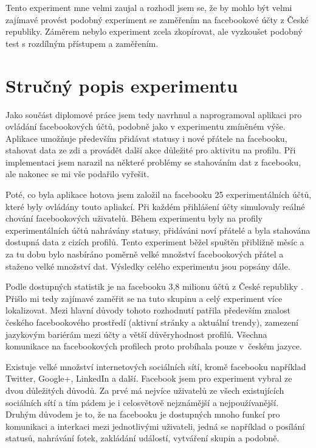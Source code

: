 \documentclass[thesis=M,czech]{FITthesis}[2013/05/10]
\begin{document}
Tento experiment mne velmi zaujal a rozhodl jsem se, že by mohlo být velmi zajímavé provést podobný experiment se zaměřením na facebookové účty z České republiky. Záměrem nebylo experiment zcela zkopírovat, ale vyzkoušet podobný test s rozdílným přístupem a zaměřením. 

\section{Stručný popis experimentu}

Jako součást diplomové práce jsem tedy navrhnul a naprogramoval aplikaci pro ovládání facebookových účtů, podobně jako v experimentu zmíněném výše. Aplikace umožňuje především přidávat statusy i nové přátele na facebooku, stahovat data ze zdi a provádět další akce důležité pro aktivitu na profilu. Při implementaci jsem narazil na některé problémy se stahováním dat z facebooku, ale nakonec se mi vše podařilo vyřešit.

Poté, co byla aplikace hotova jsem založil na facebooku 25 experimentálních účtů, které byly ovládány touto apliakcí. Při každém přihlášení účty simulovaly reálné chování facebookových uživatelů. Během experimentu byly na profily experimentálních účtů nahrávány statusy, přidáváni noví přátelé a byla stahována dostupná data z cizích profilů. Tento experiment běžel spuštěn přibližně měsíc a za tu dobu bylo nasbíráno poměrně velké množství facebookových přátel a staženo velké množství dat. Výsledky celého experimentu jsou popsány dále.

Podle dostupných statistik je na facebooku 3,8 milionu účtů z České republiky \cite{web:fbCzechUsers}. Přišlo mi tedy zajímavé zaměřit se na tuto skupinu a celý experiment více lokalizovat. Mezi hlavní důvody tohoto rozhodnutí patřila především znalost českého facebookového prostředí (aktivní stránky a aktuální trendy), zamezení jazykovým bariérám mezi účty a větší důvěryhodnost profilů. Všechna komunikace na facebookových profilech proto probíhala pouze v~českém jazyce.

Existuje velké množství internetových sociálních sítí, kromě facebooku například Twitter, Google+, LinkedIn a další. Facebook jsem pro experiment vybral ze dvou důležitých důvodů. Za prvé má nejvíce uživatelů ze všech existujících sociálních sítí a tím pádem je i celosvětově nejznámější a nejpoužívanější. Druhým důvodem je to, že na facebooku je dostupných mnoho funkcí pro komunikaci a interkaci mezi jednotlivými uživateli, jedná se například o posílání statusů, nahrávání fotek, zakládání událostí, vytváření skupin a podobně.
\end{document}
